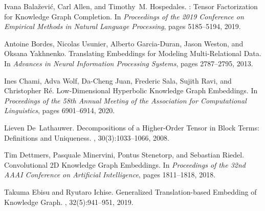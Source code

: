 \documentclass{article}
\theoremstyle{plain}
\theoremstyle{remark}
\begin{document}

\begin{thebibliography}{}

Ivana Bala{\v z}evi{\'c}, Carl Allen, and Timothy~M. Hospedales.
: {{Tensor Factorization}} for {{Knowledge Graph
  Completion}}.
\newblock In {\em Proceedings of the 2019 {{Conference}} on {{Empirical
  Methods}} in {{Natural Language Processing}}}, pages 5185--5194, 2019.

Antoine Bordes, Nicolas Usunier, Alberto {Garcia-Duran}, Jason Weston, and
  Oksana Yakhnenko.
\newblock Translating {{Embeddings}} for {{Modeling Multi-Relational Data}}.
\newblock In {\em Advances in {{Neural Information Processing Systems}}}, pages
  2787--2795, 2013.

Ines Chami, Adva Wolf, Da-Cheng Juan, Frederic Sala, Sujith Ravi, and
  Christopher R{\'e}.
\newblock Low-{{Dimensional Hyperbolic Knowledge Graph Embeddings}}.
\newblock In {\em Proceedings of the 58th {{Annual Meeting}} of the
  {{Association}} for {{Computational Linguistics}}}, pages 6901--6914, 2020.

Lieven De~Lathauwer.
\newblock Decompositions of a {{Higher-Order Tensor}} in {{Block
  Terms}}: {{Definitions}} and {{Uniqueness}}.
,
  30(3):1033--1066, 2008.

Tim Dettmers, Pasquale Minervini, Pontus Stenetorp, and Sebastian Riedel.
\newblock Convolutional {{2D Knowledge Graph Embeddings}}.
\newblock In {\em Proceedings of the 32nd {{AAAI Conference}} on {{Artificial
  Intelligence}}}, pages 1811--1818, 2018.

Takuma Ebisu and Ryutaro Ichise.
\newblock Generalized {{Translation-based Embedding}} of {{Knowledge Graph}}.
,
  32(5):941--951, 2019.


\end{thebibliography}
\end{document}
